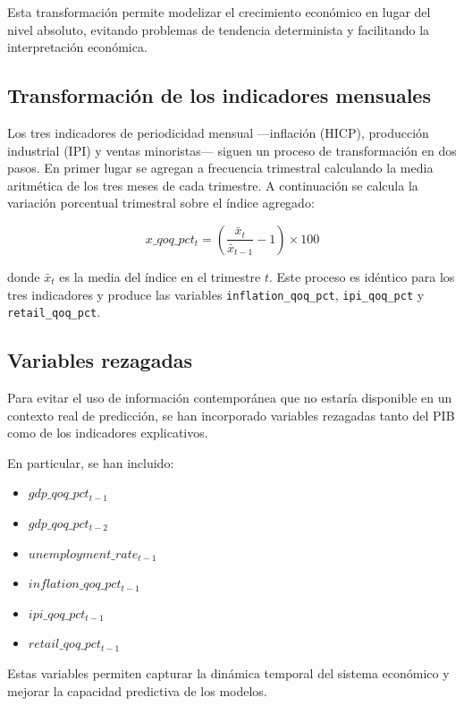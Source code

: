 Esta transformación permite modelizar el crecimiento económico en lugar del nivel absoluto, evitando problemas de tendencia determinista y facilitando la interpretación económica.

\subsection{Transformación de los indicadores mensuales}

Los tres indicadores de periodicidad mensual ---inflación (HICP), producción industrial (IPI) y ventas minoristas--- siguen un proceso de transformación en dos pasos. En primer lugar se agregan a frecuencia trimestral calculando la media aritmética de los tres meses de cada trimestre. A continuación se calcula la variación porcentual trimestral sobre el índice agregado:

\[
x\_qoq\_pct_t = \left(\frac{\bar{x}_t}{\bar{x}_{t-1}} - 1\right)\times100
\]

donde $\bar{x}_t$ es la media del índice en el trimestre $t$. Este proceso es idéntico para los tres indicadores y produce las variables \texttt{inflation\_\allowbreak{}qoq\_\allowbreak{}pct}, \texttt{ipi\_\allowbreak{}qoq\_\allowbreak{}pct} y \texttt{retail\_\allowbreak{}qoq\_\allowbreak{}pct}.

\subsection{Variables rezagadas}

Para evitar el uso de información contemporánea que no estaría disponible en un contexto real de predicción, se han incorporado variables rezagadas tanto del PIB como de los indicadores explicativos.

En particular, se han incluido:

\begin{itemize}
\item $gdp\_qoq\_pct_{t-1}$
\item $gdp\_qoq\_pct_{t-2}$
\item $unemployment\_rate_{t-1}$
\item $inflation\_qoq\_pct_{t-1}$
\item $ipi\_qoq\_pct_{t-1}$
\item $retail\_qoq\_pct_{t-1}$
\end{itemize}

Estas variables permiten capturar la dinámica temporal del sistema económico y mejorar la capacidad predictiva de los modelos.

